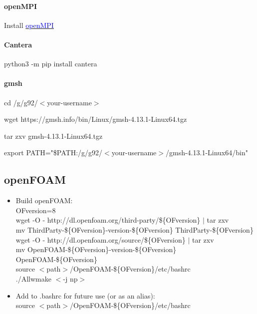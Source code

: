 \documentclass[a4paper, 12pt]{article}
\numberwithin{equation}{section}
\newcommand{\code}{\fontfamily{pcr}\selectfont}
\newcommand{\blue}[1]{\textcolor{blue}{#1}}
\begin{document}
        \paragraph{openMPI \\}
            Install \href{https://docs.open-mpi.org/en/v5.0.x/installing-open-mpi/quickstart.html}{\blue{openMPI}}

        \paragraph{Cantera \\}
            {\code python3 -m pip install cantera}

        \paragraph{gmsh \\}

            {\code cd /g/g92/$<$your-username$>$}

            {\code wget https://gmsh.info/bin/Linux/gmsh-4.13.1-Linux64.tgz}

            {\code tar zxv gmsh-4.13.1-Linux64.tgz}

            {\code export PATH="\$PATH:/g/g92/$<$your-username$>$/gmsh-4.13.1-Linux64/bin"}

    \subsection{openFOAM}
        \begin{itemize}
        \item Build openFOAM: \\
        OFversion=8 \\
        wget -O - http://dl.openfoam.org/third-party/\$\{OFversion\} $|$ tar zxv \\
        mv ThirdParty-\$\{OFversion\}-version-\$\{OFversion\} ThirdParty-\$\{OFversion\} \\
        wget -O - http://dl.openfoam.org/source/\$\{OFversion\} $|$ tar zxv \\
        mv OpenFOAM-\$\{OFversion\}-version-\$\{OFversion\} OpenFOAM-\$\{OFversion\} \\
        source $<$path$>$/OpenFOAM-\$\{OFversion\}/etc/bashrc \\
        ./Allwmake $<$-j np$>$

        \item Add to .bashrc for future use (or as an alias): \\
        source $<$path$>$/OpenFOAM-\$\{OFversion\}/etc/bashrc
        \end{itemize}
\end{document}
